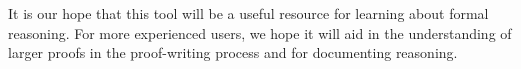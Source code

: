 \documentclass[conference]{IEEEtran}
\begin{document}
It is our hope that this tool will be a useful resource for learning about formal reasoning. For more experienced users, we hope it will aid in the understanding of larger proofs in the proof-writing process and for documenting reasoning.






%
\end{document}
